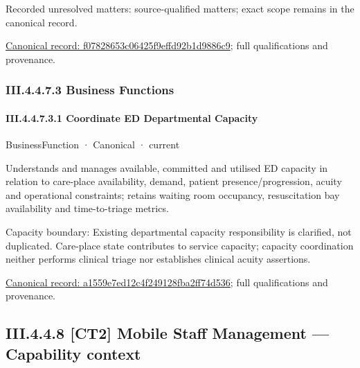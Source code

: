 {\small Recorded unresolved matters: source-qualified matters; exact scope remains in the canonical record.}\par
{\footnotesize \href{../../../../continuum/business/business-service/f07828653c06425f9effd92b1d9886c9.md}{Canonical record: f07828653c06425f9effd92b1d9886c9}; full qualifications and provenance.}\par
\subsubsection*{III.4.4.7.3 Business Functions}
\label{navigation:III.4.4.7.3}

\paragraph*{III.4.4.7.3.1 Coordinate ED Departmental Capacity}
\label{navigation:III.4.4.7.3.1}

\label{element:a1559e7ed12c4f249128fba2ff74d536}
{\small BusinessFunction · Canonical · current}\par

Understands and manages available, committed and utilised ED capacity in relation to care-place availability, demand, patient presence/progression, acuity and operational constraints; retains waiting room occupancy, resuscitation bay availability and time-to-triage metrics.



Capacity boundary: Existing departmental capacity responsibility is clarified, not duplicated. Care-place state contributes to service capacity; capacity coordination neither performs clinical triage nor establishes clinical acuity assertions.


{\footnotesize \href{../../../../continuum/business/business-function/a1559e7ed12c4f249128fba2ff74d536.md}{Canonical record: a1559e7ed12c4f249128fba2ff74d536}; full qualifications and provenance.}\par
\subsection*{III.4.4.8 [CT2] Mobile Staff Management — Capability context}
\label{navigation:III.4.4.8}

